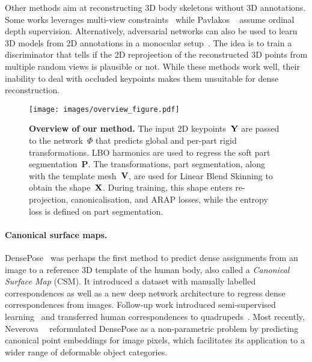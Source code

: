 Other methods aim at reconstructing 3D body skeletons without 3D annotations.
Some works leverages multi-view constraints~\cite{kocabas2019self,pavlakos2017harvesting,rhodin2018learning} while Pavlakos \etal~\cite{pavlakos2018ordinal} assume ordinal depth supervision.
Alternatively, adversarial networks can also be used to learn 3D models from 2D annotations in a monocular setup~\cite{kudo2018unsupervised,drover20183dpose,chen2019unsupervised}.
The idea is to train a discriminator that tells if the 2D reprojection of the reconstructed 3D points from multiple random views is plausible or not.
While these methods work well, their inability to deal with occluded keypoints makes them unsuitable for dense reconstruction.

\begin{figure*}[tb]
\begin{center}
\texttt{[image: images/overview\_figure.pdf]}%
\vspace{-0.7em}%
\caption{\textbf{Overview of our method.}
The input 2D keypoints~$\mathbf{Y}$ are passed to the network~$\Phi$ that predicts global and per-part rigid transformations.
LBO harmonics are used to regress the soft part segmentation~$\mathbf{P}$.
The transformations, part segmentation, along with the template mesh~$\mathbf{V}$, are used for Linear Blend Skinning to obtain the shape~$\mathbf{X}$.
During training, this shape enters re-projection, canonicalisation, and ARAP losses, while the entropy loss is defined on part segmentation.%
\vspace{-0.5cm}%
}\label{f:overview}
\end{center}
\end{figure*}

\paragraph{Canonical surface maps.}

DensePose~\cite{guler18densepose:} was perhaps the first method to predict dense assignments from an image to a reference 3D template of the human body, also called a \emph{Canonical Surface Map} (CSM).
It introduced a dataset with manually labelled correspondences as well as a new deep network architecture to regress dense correspondences from images.
Follow-up work introduced semi-supervised learning~\cite{Neverova2019} and transferred human correspondences to quadrupeds~\cite{sanakoyeu2020transferring}.
Most recently, Neverova~\etal~\cite{neverova2020continuous} reformulated DensePose as a non-parametric problem by predicting canonical point embeddings for image pixels,
which facilitates its application to a wider range of deformable object categories.

